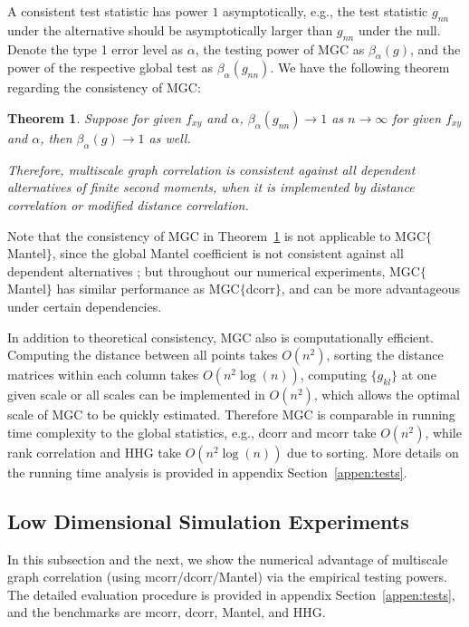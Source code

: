 \documentclass[11pt]{article}
\newtheorem{thm}{Theorem}
\begin{document}
A consistent test statistic has power $1$ asymptotically, e.g., the test statistic $g_{nn}$ under the alternative should be asymptotically larger than $g_{nn}$ under the null. Denote the type 1 error level as $\alpha$, the testing power of MGC as $\beta_{\alpha}(g)$, and the power of the respective global test as $\beta_{\alpha}(g_{nn})$. We have the following theorem regarding the consistency of MGC:
\begin{thm}
\label{thm1}
Suppose for given $f_{xy}$ and $\alpha$, $\beta_{\alpha}(g_{nn}) \rightarrow 1$ as $n \rightarrow \infty$ for given $f_{xy}$ and $\alpha$, then $\beta_{\alpha}(g) \rightarrow 1$ as well.

Therefore, multiscale graph correlation is consistent against all dependent alternatives of finite second moments, when it is implemented by distance correlation or modified distance correlation.
\end{thm}

Note that the consistency of MGC in Theorem~\ref{thm1} is not applicable to MGC$\{$Mantel$\}$, since the global Mantel coefficient is not consistent against all dependent alternatives \cite{JosseHolmes2013}; but throughout our numerical experiments, MGC$\{$Mantel$\}$ has similar performance as MGC$\{$dcorr$\}$, and can be more advantageous under certain dependencies.

In addition to theoretical consistency, MGC also is computationally efficient. Computing the distance between all points takes $O(n^2)$, sorting the distance matrices within each column takes $O(n^2\log(n))$, computing $\{g_{kl}\}$ at one given scale or all scales can be implemented in $O(n^2)$, which allows the optimal scale of MGC to be quickly estimated. Therefore MGC is comparable in running time complexity to the global statistics, e.g., dcorr and mcorr take $O(n^2)$, while rank correlation and HHG take $O(n^2\log(n))$ due to sorting. More details on the running time analysis is provided in appendix Section~\ref{appen:tests}.


\subsection{Low Dimensional Simulation Experiments}
\label{numer1}
In this subsection and the next, we show the numerical advantage of multiscale graph correlation (using mcorr/dcorr/Mantel) via the empirical testing powers. The detailed evaluation procedure is provided in appendix Section~\ref{appen:tests}, and the benchmarks are mcorr, dcorr, Mantel, and HHG.
\end{document}
